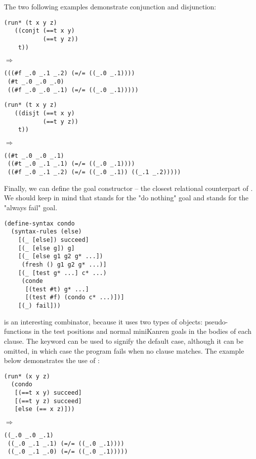 The two following examples demonstrate conjunction and disjunction:
\begin{lstlisting}
(run* (t x y z)
   ((conjt (==t x y)
           (==t y z))
    t))
\end{lstlisting}
$\Rightarrow$
\begin{lstlisting}
(((#f _.0 _.1 _.2) (=/= ((_.0 _.1))))
 (#t _.0 _.0 _.0)
 ((#f _.0 _.0 _.1) (=/= ((_.0 _.1)))))
\end{lstlisting}

\begin{lstlisting}
(run* (t x y z)
   ((disjt (==t x y)
           (==t y z))
    t))
\end{lstlisting}
$\Rightarrow$
\begin{lstlisting}
((#t _.0 _.0 _.1)
 ((#t _.0 _.1 _.1) (=/= ((_.0 _.1))))
 ((#f _.0 _.1 _.2) (=/= ((_.0 _.1)) ((_.1 _.2)))))
\end{lstlisting}

Finally, we can define the goal constructor  -- the closest relational counterpart of . We should keep in mind that  stands for the "do nothing" goal and  stands for the "always fail" goal.
\begin{lstlisting}
(define-syntax condo
  (syntax-rules (else)
    [(_ [else]) succeed]
    [(_ [else g]) g]
    [(_ [else g1 g2 g* ...])
     (fresh () g1 g2 g* ...)]
    [(_ [test g* ...] c* ...)
     (conde
      [(test #t) g* ...]
      [(test #f) (condo c* ...)])]
    [(_) fail]))
\end{lstlisting}
 is an interesting combinator, because it uses two types of objects: pseudo-functions in the test positions and normal miniKanren goals in the bodies of each clause. The  keyword can be used to signify the default case, although it can be omitted, in which case the program fails when no clause matches. The example below demonstrates the use of :
\begin{lstlisting}
(run* (x y z)
  (condo
   [(==t x y) succeed]
   [(==t y z) succeed]
   [else (== x z)]))
\end{lstlisting}
$\Rightarrow$
\begin{lstlisting}
((_.0 _.0 _.1)
 ((_.0 _.1 _.1) (=/= ((_.0 _.1))))
 ((_.0 _.1 _.0) (=/= ((_.0 _.1)))))
\end{lstlisting}

